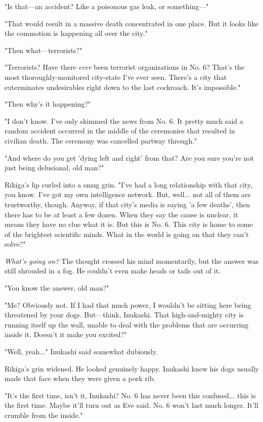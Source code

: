 "Is that---an accident? Like a poisonous gas leak, or something---"

"That would result in a massive death concentrated in one place. But it
looks like the commotion is happening all over the city."

"Then what---terrorists?"

"Terrorists? Have there \emph{ever} been terrorist organizations in No. 6?
That's the most thoroughly-monitored city-state I've ever seen. There's
a city that exterminates undesirables right down to the last cockroach.
It's impossible."

"Then why's it happening?"

"I don't know. I've only skimmed the news from No. 6. It pretty much
said a random accident occurred in the middle of the ceremonies that
resulted in civilian death. The ceremony was cancelled partway through."

"And where do you get 'dying left and right' from that? Are you sure
you're not just being delusional, old man?"

Rikiga's lip curled into a smug grin. "I've had a long relationship with
that city, you know. I've got my own intelligence network. But, well...
not all of them are trustworthy, though. Anyway, if that city's media is
saying 'a few deaths', then there has to be at least a few dozen. When
they say the cause is unclear, it means they have no clue what it is.
But this is No. 6. This city is home to some of the brightest scientific
minds. What in the world is going on that they can't solve?"

\emph{What's going on?} The thought crossed his mind momentarily, but the
answer was still shrouded in a fog. He couldn't even make heads or tails
out of it.

"You know the answer, old man?"

"Me? Obviously not. If I had that much power, I wouldn't be sitting here
being threatened by your dogs. But---think, Inukashi. That high-and-mighty
city is running itself up the wall, unable to deal with the problems
that are occurring inside it. Doesn't it make you excited?"

"Well, yeah..." Inukashi said somewhat dubiously.

Rikiga's grin widened. He looked genuinely happy. Inukashi knew his dogs
usually made that face when they were given a pork rib.

"It's the first time, isn't it, Inukashi? No. 6 has never been this
confused... this is the first time. Maybe it'll turn out as Eve said.
No. 6 won't last much longer. It'll crumble from the inside."

